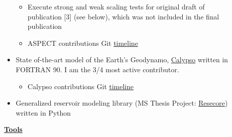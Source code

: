 \documentclass[11pt]{ltxdoc}
\begin{document}
\begin{description}
\begin{itemize}
\begin{itemize}
            \item Execute strong and weak scaling tests for original draft of publication [3] (see below), which was not included in the final publication              
            
            \item ASPECT contributions Git \href{https://github.com/geodynamics/aspect/commits?author=hlokavarapu}{timeline}

           \end{itemize}
      
      \item State of-the-art model of the Earth's Geodynamo,
      \href{https://geodynamics.org/cig/software/calypso/}{Calypso} written in FORTRAN 90. I am the 3/4 most active contributor.
      
         \begin{itemize}
          	\item Calypso contributions Git \href{https://github.com/geodynamics/calypso/commits/Legendre_transform_w_symmetry}{timeline}
          \end{itemize}
      
      \item Generalized reservoir modeling library (MS Thesis Project: \href{https://github.com/hlokavarapu/resecore.git}{Resecore}) written in Python
            
    \end{itemize}
                                      
    
  

    \item[] \textbf{\underline{Tools}}
    

\end{description}
\end{document}
